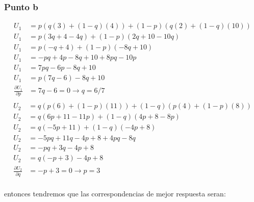 \documentclass[11pt]{article}
\begin{document}
\subsubsection{Punto b}

\begin{flushleft}
    \begin{align*}
        U_1 &= p(q(3)+(1-q)(4))+(1-p)(q(2)+(1-q)(10))\\
        U_1 &= p(3q+4-4q)+(1-p)(2q+10-10q)\\
        U_1 &= p(-q+4)+(1-p)(-8q+10)\\
        U_1 &= -pq+4p-8q+10+8pq-10p\\
        U_1 &= 7pq-6p-8q+10\\
        U_1 &= p(7q-6)-8q+10\\
        \frac{\partial U_1}{\partial p} &= 7q-6=0\to q=6/7\\
    \end{align*}
    \begin{align*}
        U_2 &= q(p(6)+(1-p)(11))+(1-q)(p(4)+(1-p)(8))\\
        U_2 &= q(6p+11-11p)+(1-q)(4p+8-8p)\\
        U_2 &= q(-5p+11)+(1-q)(-4p+8)\\
        U_2 &= -5pq+11q-4p+8+4pq-8q\\
        U_2 &= -pq+3q-4p+8\\
        U_2 &= q(-p+3)-4p+8\\
        \frac{\partial U_2}{\partial q} &= -p+3=0\to p=3\\
    \end{align*}

    entonces tendremos que las correspondencias de mejor respuesta seran:\\~\\


\end{flushleft}
\end{document}
